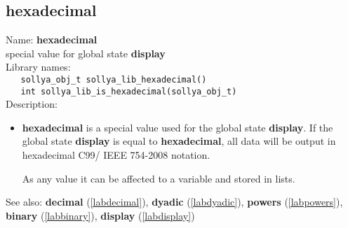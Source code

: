 \subsection{hexadecimal}
\label{labhexadecimal}
\noindent Name: \textbf{hexadecimal}\\
\phantom{aaa}special value for global state \textbf{display}\\[0.2cm]
\noindent Library names:\\
\verb|   sollya_obj_t sollya_lib_hexadecimal()|\\
\verb|   int sollya_lib_is_hexadecimal(sollya_obj_t)|\\[0.2cm]
\noindent Description: \begin{itemize}

\item \textbf{hexadecimal} is a special value used for the global state \textbf{display}.  If
   the global state \textbf{display} is equal to \textbf{hexadecimal}, all data will be
   output in hexadecimal C99/ IEEE 754-2008 notation.
    
   As any value it can be affected to a variable and stored in lists.
\end{itemize}
See also: \textbf{decimal} (\ref{labdecimal}), \textbf{dyadic} (\ref{labdyadic}), \textbf{powers} (\ref{labpowers}), \textbf{binary} (\ref{labbinary}), \textbf{display} (\ref{labdisplay})
